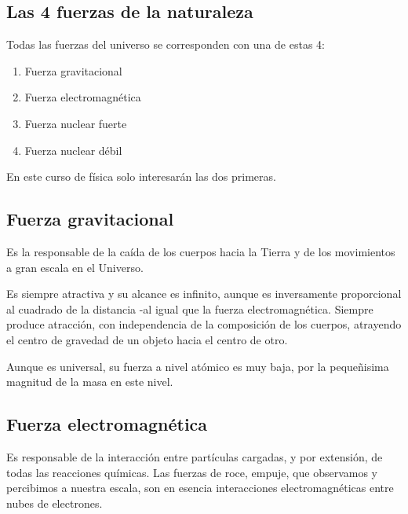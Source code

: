 \subsection{Las 4 fuerzas de la naturaleza}

Todas las fuerzas del universo se corresponden con una de estas 4:
\begin{enumerate}
    \item Fuerza gravitacional
    \item Fuerza electromagnética
    \item Fuerza nuclear fuerte
    \item Fuerza nuclear débil
\end{enumerate}

En este curso de física solo interesarán las dos primeras.

\subsection{Fuerza gravitacional}

Es la responsable de la caída de los cuerpos hacia la Tierra y de los movimientos 
a gran escala en el Universo.

Es siempre atractiva y su alcance es infinito,
aunque es inversamente proporcional al cuadrado de la distancia 
-al igual que la fuerza electromagnética.
Siempre produce atracción, con independencia de la composición de los cuerpos,
atrayendo el centro de gravedad de un objeto hacia el centro de otro.

Aunque es universal,
su fuerza a nivel atómico es muy baja,
por la pequeñisima magnitud de la masa en este nivel.

\subsection{Fuerza electromagnética}

Es responsable de la interacción entre partículas cargadas,
y por extensión, de todas las reacciones químicas.
Las fuerzas de roce, empuje, que observamos y percibimos a nuestra escala,
son en esencia interacciones electromagnéticas entre nubes de electrones.
